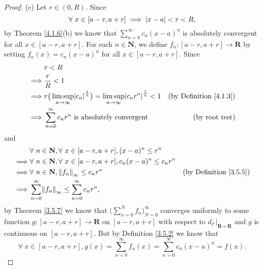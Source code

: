 \begin{proof}{(c)}
    Let \(r \in (0, R)\).
    Since
    \[
        \forall\ x \in [a - r, a + r] \implies \abs*{x - a} < r < R,
    \]
    by Theorem \ref{4.1.6}(b) we know that \(\sum_{n = 0}^\infty c_n (x - a)^n\) is absolutely convergent for all \(x \in [a - r, a + r]\).
    For each \(n \in \mathbf{N}\), we define \(f_n : [a - r, a + r] \to \mathbf{R}\) by setting \(f_n(x) = c_n (x - a)^n\) for all \(x \in [a - r, a + r]\).
    Since
    \begin{align*}
                 & r < R                                                                                                                                                      \\
        \implies & \frac{r}{R} < 1                                                                                                                                            \\
        \implies & r \big(\limsup_{n \to \infty} \abs*{c_n}^{\frac{1}{n}}\big) = \limsup_{n \to \infty} \abs*{c_n r^n}^{\frac{1}{n}} < 1 & \text{(by Definition \ref{4.1.3})} \\
        \implies & \sum_{n = 0}^\infty c_n r^n \text{ is absolutely convergent}                                                          & \text{(by root test)}
    \end{align*}
    and
    \begin{align*}
                 & \forall\ n \in \mathbf{N}, \forall\ x \in [a - r, a + r], (x - a)^n \leq r^n                                              \\
        \implies & \forall\ n \in \mathbf{N}, \forall\ x \in [a - r, a + r], c_n (x - a)^n \leq c_n r^n                                      \\
        \implies & \forall\ n \in \mathbf{N}, \norm*{f_n}_\infty \leq c_n r^n                           & \text{(by Definition \ref{3.5.5})} \\
        \implies & \sum_{n = 0}^\infty \norm*{f_n}_\infty \leq \sum_{n = 0}^\infty c_n r^n,
    \end{align*}
    by Theorem \ref{3.5.7} we know that \(\big(\sum_{n = 0}^N f_n\big)_{N = 0}^\infty\) converges uniformly to some function \(g : [a - r, a + r] \to \mathbf{R}\) on \([a - r, a + r]\) with respect to \(d_{l^1}|_{\mathbf{R} \times \mathbf{R}}\) and \(g\) is continuous on \([a - r, a + r]\).
    But by Definition \ref{3.5.2} we know that
    \[
        \forall\ x \in [a - r, a + r], g(x) = \sum_{n = 0}^\infty f_n(x) = \sum_{n = 0}^\infty c_n (x - a)^n = f(x).
\]
\end{proof}

